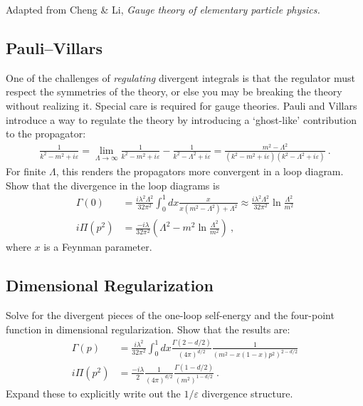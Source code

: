 \documentclass[12pt]{article}
\numberwithin{equation}{subsection}    %
\begin{document}
{\footnotesize Adapted from Cheng \& Li, \emph{Gauge theory of elementary particle physics.}

\subsection{Pauli--Villars}

One of the challenges of \emph{regulating} divergent integrals is that the regulator must respect the symmetries of the theory, or else you may be breaking the theory without realizing it. Special care is required for gauge theories. Pauli and Villars introduce a way to regulate the theory by introducing a `ghost-like' contribution to the propagator:
\begin{align}
	\frac{1}{k^2 - m^2 + i \varepsilon}
	=
	\lim_{\Lambda\to\infty}
	\frac{1}{k^2 - m^2 + i \varepsilon}
	-
	\frac{1}{k^2 - \Lambda^2 + i \varepsilon}
	=
	\frac{m^2 - \Lambda^2}{\left(k^2 - m^2 + i \varepsilon\right)\left(k^2 - \Lambda^2 + i \varepsilon\right)}
	\ .
\end{align}
For finite $\Lambda$, this renders the propagators more convergent in a loop diagram. Show that the divergence in the loop diagrams is
\begin{align}
	\Gamma(0)
	&=
	\frac{i\lambda^2\Lambda^2}{32\pi^2}
	\int_0^1
	dx
	\frac{x}{x(m^2-\Lambda^2) + \Lambda^2} \approx 
	\frac{i\lambda^2\Lambda^2}{32\pi^2}
	\ln \frac{\Lambda^2}{m^2} 
	\\
	i\Pi(p^2) &= 
	\frac{-i\lambda}{32\pi^2}\left(\Lambda^2 - m^2 \ln \frac{\Lambda^2}{m^2}\right) %
	\ ,
\end{align}
where $x$ is a Feynman parameter.


\subsection{Dimensional Regularization}

Solve for the divergent pieces of the one-loop self-energy and the four-point function in dimensional regularization. Show that the results are:
\begin{align}
	\Gamma(p) &= 
		\frac{i\lambda^2}{32\pi^2}
		\int_0^1 dx \frac{\Gamma(2-d/2)}{(4\pi)^{d/2}} \frac{1}{(m^2-x(1-x)p^2)^{2-d/2}}
		\\
	i\Pi(p^2) &= \frac{-i\lambda}{2} \frac{1}{(4\pi)^{d/2}} \frac{\Gamma(1-d/2)}{(m^2)^{1-d/2}} \ .
\end{align}
Expand these to explicitly write out the $1/\varepsilon$ divergence structure.


}
\end{document}
